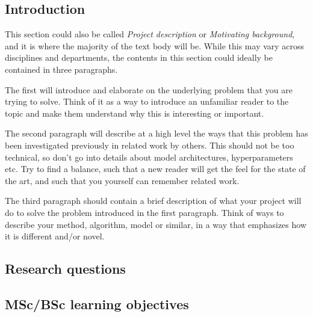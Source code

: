 \documentclass{article}
\begin{document}
\subsection{Introduction}
This section could also be called \emph{Project description} or \emph{Motivating background}, and it is where the majority of the text body will be.
While this may vary across disciplines and departments, the contents in this section could ideally be contained in three paragraphs.

The first will introduce and elaborate on the underlying problem that you are trying to solve.
Think of it as a way to introduce an unfamiliar reader to the topic and make them understand why this is interesting or important.

The second paragraph will describe at a high level the ways that this problem has been investigated previously in related work by others.
This should not be too technical, so don't go into details about model architectures, hyperparameters etc. 
Try to find a balance, such that a new reader will get the feel for the state of the art, and such that you yourself can remember related work.

The third paragraph should contain a brief description of what your project will do to solve the problem introduced in the first paragraph.
Think of ways to describe your method, algorithm, model or similar, in a way that emphasizes how it is different and/or novel.


\subsection{Research questions}

\subsection{MSc/BSc learning objectives}
\end{document}
